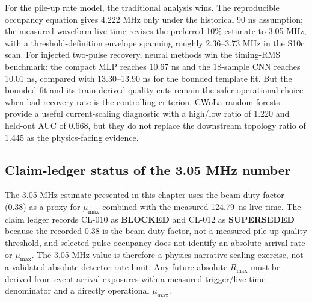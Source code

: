 For the pile-up rate model, the traditional analysis wins.  The reproducible
occupancy equation gives 4.222 MHz only under the historical 90 ns assumption;
the measured waveform live-time revises the preferred 10\% estimate to
3.05 MHz, with a threshold-definition envelope spanning roughly
2.36--3.73 MHz in the S10c scan.  For injected two-pulse recovery, neural
methods win the timing-RMS benchmark: the compact MLP reaches 10.67 ns and the
18-sample CNN reaches 10.01 ns, compared with 13.30--13.90 ns for the bounded
template fit.  But the bounded fit and its train-derived quality cuts remain
the safer operational choice when bad-recovery rate is the controlling
criterion.  CWoLa random forests provide a useful current-scaling diagnostic
with a high/low ratio of 1.220 and held-out AUC of 0.668, but they do not
replace the downstream topology ratio of 1.445 as the physics-facing evidence.

\subsection{Claim-ledger status of the 3.05 MHz number}

The 3.05 MHz estimate presented in this chapter uses the beam duty factor
(0.38) as a proxy for $\mu_{\max}$ combined with the measured 124.79~ns
live-time.  The claim ledger records CL-010 as \textbf{BLOCKED} and
CL-012 as \textbf{SUPERSEDED} because the recorded 0.38 is the beam duty
factor, not a measured pile-up-quality threshold, and selected-pulse occupancy
does not identify an absolute arrival rate or $\mu_{\max}$.  The 3.05 MHz
value is therefore a physics-narrative scaling exercise, not a validated
absolute detector rate limit.  Any future absolute $R_{\max}$ must be derived
from event-arrival exposures with a measured trigger/live-time denominator and
a directly operational $\mu_{\max}$.